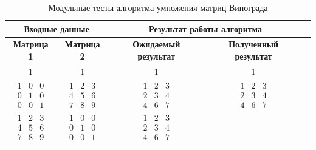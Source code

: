 \newpage
\begin{table}[ht]
	\small
	\begin{center}
		\begin{threeparttable}
			\caption{Модульные тесты алгоритма умножения матриц Винограда}
			\label{tests:winograd}
			\begin{tabular}{|c|c|c|c|c|}
				\hline
				\multicolumn{2}{|c|}{\bfseries Входные данные}
				& \multicolumn{2}{c|}{\bfseries Результат работы алгоритма} \\
				\hline 
				\bfseries Матрица 1
				& \bfseries Матрица 2
				& \bfseries Ожидаемый результат
				& \bfseries Полученный результат \\
				\hline
				1 & 1 & 1 & 1 \\ 
				\hline
				$\begin{matrix}
					1 & 0 & 0\\
					0 & 1 & 0\\
					0 & 0 & 1
				\end{matrix}$ 
				&  
				$\begin{matrix}
					1 & 2 & 3\\
					4 & 5 & 6\\
					7 & 8 & 9
				\end{matrix}$ 
				&
				$\begin{matrix}
					1 & 2 & 3\\
					2 & 3 & 4\\
					4 & 6 & 7
				\end{matrix}$ 
				&
				$\begin{matrix}
					1 & 2 & 3\\
					2 & 3 & 4\\
					4 & 6 & 7
				\end{matrix}$  \\ 
				\hline
				$\begin{matrix}
					1 & 2 & 3\\
					4 & 5 & 6\\
					7 & 8 & 9
				\end{matrix}$ 
				&
				$\begin{matrix}
					1 & 0 & 0\\
					0 & 1 & 0\\
					0 & 0 & 1
				\end{matrix}$ 
				&  
				$\begin{matrix}
					1 & 2 & 3\\
					2 & 3 & 4\\
					4 & 6 & 7
				\end{matrix}$ 

\end{tabular}
\end{threeparttable}
\end{center}
\end{table}

